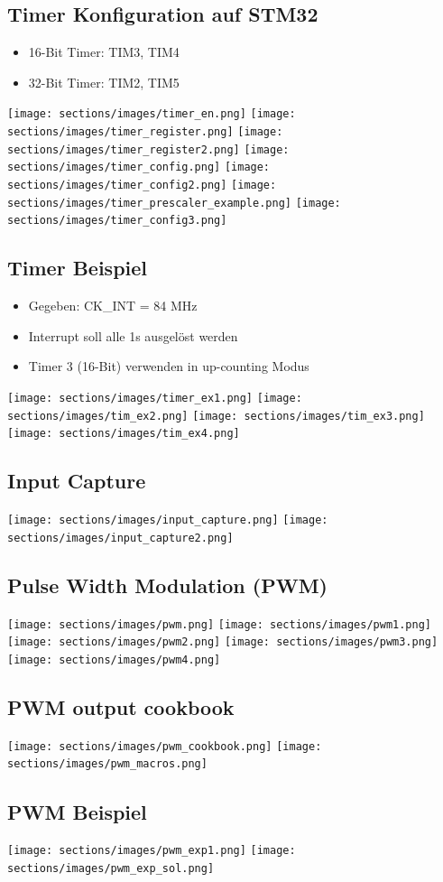 \subsection{Timer Konfiguration auf STM32}
\begin{itemize}
    \item 16-Bit Timer: TIM3, TIM4
    \item 32-Bit Timer: TIM2, TIM5
\end{itemize}
\texttt{[image: sections/images/timer\_en.png]}
\texttt{[image: sections/images/timer\_register.png]}
\texttt{[image: sections/images/timer\_register2.png]}
\texttt{[image: sections/images/timer\_config.png]}
\texttt{[image: sections/images/timer\_config2.png]}
\texttt{[image: sections/images/timer\_prescaler\_example.png]}
\texttt{[image: sections/images/timer\_config3.png]}

\subsection{Timer Beispiel}
\begin{itemize}
    \item Gegeben: CK\_INT = 84 MHz
    \item Interrupt soll alle 1s ausgelöst werden
    \item Timer 3 (16-Bit) verwenden in up-counting Modus
\end{itemize}
\texttt{[image: sections/images/timer\_ex1.png]}
\texttt{[image: sections/images/tim\_ex2.png]}
\texttt{[image: sections/images/tim\_ex3.png]}
\texttt{[image: sections/images/tim\_ex4.png]}

\subsection{Input Capture}
\texttt{[image: sections/images/input\_capture.png]}
\texttt{[image: sections/images/input\_capture2.png]}

\subsection{Pulse Width Modulation (PWM)}
\texttt{[image: sections/images/pwm.png]}
\texttt{[image: sections/images/pwm1.png]}
\texttt{[image: sections/images/pwm2.png]}
\texttt{[image: sections/images/pwm3.png]}
\texttt{[image: sections/images/pwm4.png]}

\subsection{PWM output cookbook}
\texttt{[image: sections/images/pwm\_cookbook.png]}
\texttt{[image: sections/images/pwm\_macros.png]}

\subsection{PWM Beispiel}
\texttt{[image: sections/images/pwm\_exp1.png]}
\texttt{[image: sections/images/pwm\_exp\_sol.png]}